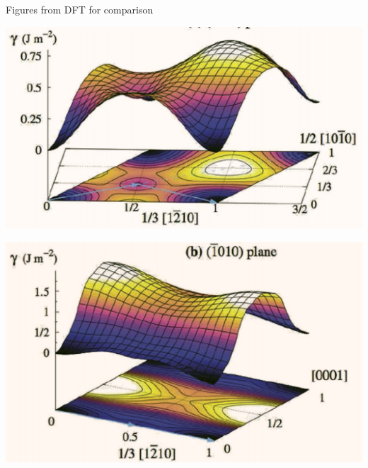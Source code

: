 \documentclass[11pt]{article}
\begin{document}
Figures from DFT for comparison 
\begin{center}
\includegraphics[width=.9\linewidth]{Images/rodney_basal_ti_gamma_surface.png}
\end{center}
\begin{center}
\includegraphics[width=.9\linewidth]{Images/rodney_prismatic_ti_gamma_surface.png}
\end{center}
\end{document}

